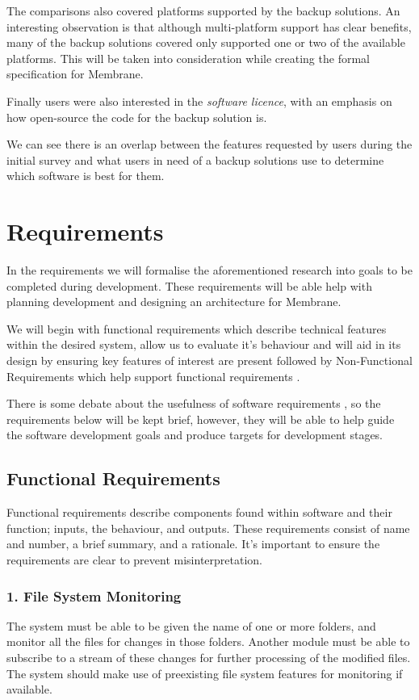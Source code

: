 \documentclass[11pt, a4paper, twocolumn, twoside]{report}
\begin{document}
The comparisons also covered platforms supported by the backup solutions. An interesting observation is that although multi-platform support has clear benefits, many of the backup solutions covered only supported one or two of the available platforms. This will be taken into consideration while creating the formal specification for Membrane.

Finally users were also interested in the \emph{software licence}, with an emphasis on how open-source the code for the backup solution is.

We can see there is an overlap between the features requested by users during the initial survey and what users in need of a backup solutions use to determine which software is best for them.

\section{Requirements} \label{sec:requirements}

In the requirements we will formalise the aforementioned research into goals to be completed during development. These requirements will be able help with planning development and designing an architecture for Membrane.

We will begin with functional requirements which describe technical features within the desired system, allow us to evaluate it's behaviour and will aid in its design by ensuring key features of interest are present \citep{van2009requirements} followed by Non-Functional Requirements which help support functional requirements \cite{chung2012non}.

There is some debate about the usefulness of software requirements \cite{kneuper1997limits}, so the requirements below will be kept brief, however, they will be able to help guide the software development goals and produce targets for development stages.

\subsection{Functional Requirements}

Functional requirements describe components found within software and their function; inputs, the behaviour, and outputs. These requirements consist of name and number, a brief summary, and a rationale. It's important to ensure the requirements are clear to prevent misinterpretation.

\subsubsection{1. File System Monitoring}
The system must be able to be given the name of one or more folders, and monitor all the files for changes in those folders. Another module must be able to subscribe to a stream of these changes for further processing of the modified files. The system should make use of preexisting file system features for monitoring if available.
\end{document}

